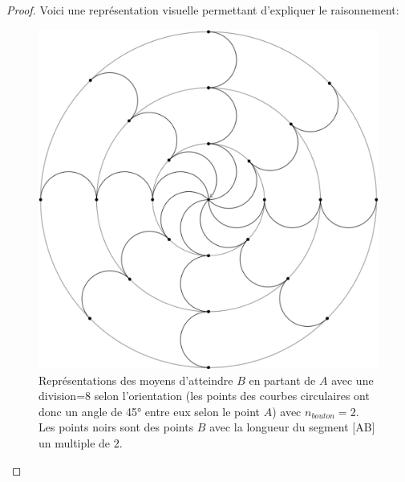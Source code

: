\documentclass{amsart}
\theoremstyle{definition}
\theoremstyle{remark}
\numberwithin{equation}{section}
\begin{document}
\begin{proof}
  Voici une représentation visuelle permettant d'expliquer le raisonnement:
  \begin{figure}[H]
    \centering
    \includegraphics[scale=0.27]{visualization.png}
    \caption{Représentations des moyens d'atteindre $B$ en partant de $A$ avec une division=8 selon l'orientation (les points des courbes circulaires ont donc un angle de 45° entre eux selon le point $A$) avec $n_{bouton}=2$. 
    Les points noirs sont des points $B$ avec la longueur du segment [AB] un multiple de $2$.}
  \end{figure}
\end{proof}
\end{document}
